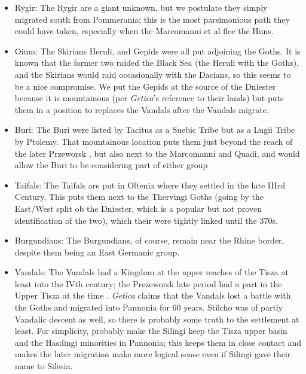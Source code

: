 \documentclass{article}
\begin{document}
	\begin{itemize}
		\item Rygir:\newline
		The Rygir are a giant unknown, but we postulate they simply migrated south from Pommerania; this is the most parsimonious path they could have taken, especially when the Marcomanni et al flee the Huns.
		
		\item Oium:\newline
		The Skirians Heruli, and Gepids were all put adjoining the Goths.
		It is known that the former two raided the Black Sea (the Heruli with the Goths), and the Skirians would raid occasionally with the Dacians, so this seems to be a nice compromise.
		We put the Gepids at the source of the Dniester because it is mountainous (per \textit{Getica}'s reference to their lands) but puts them in a position to replaces the Vandals after the Vandals migrate.
		
		\item Buri:\newline
		The Buri were listed by Tacitus as a Suebic Tribe but as a Lugii Tribe by Ptolemy.
		That mountainous location puts them just beyond the reach of the later Przeworsk \cite{HeatherEmpiresAndBarbarians,PrzeworskHistory}, but also next to the Marcomanni and Quadi, and would allow the Buri to be considering part of either group
		
		\item Taifals:\newline
		The Taifals are put in Oltenia where they settled in the late IIIrd Century.
		This puts them next to the Thervingi Goths (going by the East/West split ob the Dniester, which is a popular but not proven identification of the two), which their were tightly linked until the 370s.
		\item Burgundians:\newline
		The Burgundians, of course, remain near the Rhine border, despite them being an East Germanic group.
		
		\item Vandals:\newline
		The Vandals had a Kingdom at the upper reaches of the Tisza at least into the IVth century; the Prezeworsk late period had a part in the Upper Tisza at the time \cite{PrzeworskHistory}.\newline
		\textit{Getica} claims that the Vandals lost a battle with the Goths and migrated into Pannonia for 60 years.\newline
		Stilcho was of partly Vandalic descent as well, so there is probably some truth to the settlement at least.\newline
		For simplicity, probably make the Silingi keep the Tisza upper basin and the Hasdingi minorities in Pannonia; this keeps them in close contact and makes the later  migration make more logical sense even if Silingi gave their name to Silesia.
		

\end{itemize}
\end{document}
